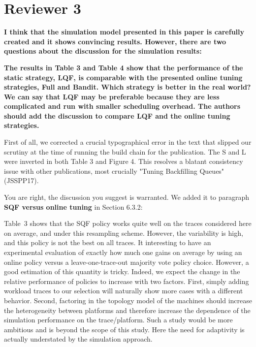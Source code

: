 \documentclass[]{article}
\begin{document}
\section{Reviewer 3}


\textbf{I think that the simulation model presented in this paper is carefully created and it shows convincing results.
However, there are two questions about the discussion for the simulation results:
}

\textbf{The results in Table 3 and Table 4 show that the performance of the static strategy, LQF, is comparable with the
presented online tuning strategies, Full and Bandit. Which strategy is better in the real world? We can say that LQF
may be preferable because they are less complicated and run with smaller scheduling overhead. The authors should add
the discussion to compare LQF and the online tuning strategies.
}

First of all, we corrected a crucial typographical error in the text that slipped
our scrutiny at the time of running the build chain for the publication. The S and
L were inverted in both Table 3 and Figure 4. This resolves a blatant
consistency issue with other publications, most crucially "Tuning Backfilling
Queues"(JSSPP17).

You are right, the discussion you suggest is warranted. We added it to
paragraph \textbf{SQF versus online tuning} in Section 6.3.2:

\begin{displayquote}

Table~3 shows that the SQF policy works quite well on the traces considered
  here on average, and under this resampling scheme. However, the variability
  is high, and this policy is not the best on all traces. It interesting to
  have an experimental evaluation of exactly how much one gains on average by
  using an online policy versus a leave-one-trace-out majority vote policy
  choice.  However, a good estimation of this quantity is tricky. Indeed, we
  expect the change in the relative performance of policies to increase with
  two factors. First, simply adding workload traces to our selection will
  naturally show more cases with a different behavior. Second, factoring in the
  topology model of the machines should increase the heterogeneity between
  platforms and therefore increase the dependence of the simulation performance
  on the trace/platform. Such a study would be more ambitious and is beyond the
  scope of this study. Here the need for adaptivity is actually understated by
  the simulation approach.

\end{displayquote}
\end{document}
